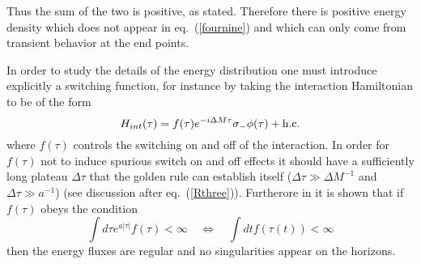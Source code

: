 \documentclass[12pt,oneside]{report}
\begin{document}
Thus the sum of the two is positive, as stated.
Therefore there is  positive energy density
which does not appear in eq.~(\ref{fournine}) and which
can only come  from transient behavior at the end points.


In order to study the details of  the energy distribution one must introduce
explicitly a switching function, for instance by  taking the
interaction Hamiltonian to be of the form \begin{equation}
H_{int} (\tau)= f(\tau) e^{-i \Delta M \tau} \sigma_- \phi(\tau) +
\hbox{h.c.} \label{fiveseven}
\end{equation}
where $f(\tau)$ controls the switching on and off of the interaction.
In order for $f(\tau)$ not to induce spurious switch on and off effects it
should have a sufficiently long plateau $\Delta \tau$ that the golden rule can
establish itself ($\Delta \tau \gg  \Delta  M^{-1}$ and $\Delta \tau \gg  a^{-1}$)
(see discussion after eq.~(\ref{Rthree})).
Furtherore in  \cite{MaPa}
it is shown that if $f(\tau)$ obeys the condition
\begin{equation}
\int d\tau e^{a\vert \tau \vert} f(\tau) < \infty
\quad \Leftrightarrow \quad
\int dt f(\tau(t)) < \infty
\label{fiveeight}
\end{equation}
then the energy fluxes are regular and no singularities appear on the
horizons.
\end{document}
